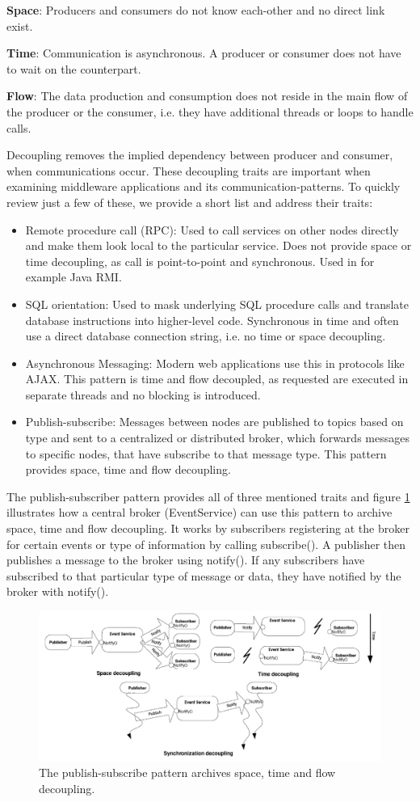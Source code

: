 \noindent \textbf{Space}: Producers and consumers do not know each-other and no direct link exist.

\noindent \textbf{Time}: Communication is asynchronous. A producer or consumer does not have to wait on the counterpart.

\noindent \textbf{Flow}: The data production and consumption does not reside in the main flow of the producer or the consumer, i.e. they have additional threads or loops to handle calls.

\noindent Decoupling removes the implied dependency between producer and consumer, when communications occur. These decoupling traits are important when examining middleware applications and its communication-patterns. To quickly review just a few of these, we provide a short list and address their traits:

\begin{itemize}
	\item Remote procedure call (RPC): Used to call services on other nodes directly and make them look local to the particular service. Does not provide space or time decoupling, as call is point-to-point and synchronous. Used in for example Java RMI.
	\item SQL orientation: Used to mask underlying SQL procedure calls and translate database instructions into higher-level code. Synchronous in time and often use a direct database connection string, i.e. no time or space decoupling.
	\item Asynchronous Messaging: Modern web applications use this in protocols like AJAX. This pattern is time and flow decoupled, as requested are executed in separate threads and no blocking is introduced.
	\item Publish-subscribe: Messages between nodes are published to topics based on type and sent to a centralized or distributed broker, which forwards messages to specific nodes, that have subscribe to that message type. This pattern provides space, time and flow decoupling.
\end{itemize}

\noindent The publish-subscriber pattern provides all of three mentioned traits and figure \ref{fig:pubsub} illustrates how a central broker (EventService) can use this pattern to archive space, time and flow decoupling. It works by subscribers registering at the broker for certain events or type of information by calling subscribe(). A publisher then publishes a message to the broker using notify(). If any subscribers have subscribed to that particular type of message or data, they have notified by the broker with notify().

\begin{figure}[h!]\label{}
	\centering
	\includegraphics[scale=0.6]{middleware/pubsub.png}
	\caption{The publish-subscribe pattern archives space, time and flow decoupling.}
	\label{fig:pubsub}
\end{figure}